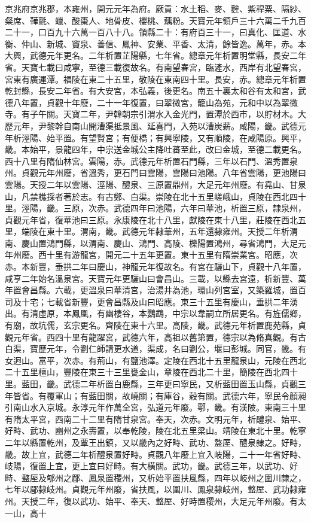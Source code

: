 \begin{pinyinscope}
 京兆府京兆郡，本雍州，開元元年為府。厥貢：水土稻、麥、麰、紫稈粟、隔紗、粲席、鞾氈、蠟、酸棗人、地骨皮、櫻桃、藕粉。天寶元年領戶三十六萬二千九百二十一，口百九十六萬一百八十八。領縣二十：有府百三十一，曰真化、匡道、水衡、仲山、新城、竇泉、善信、鳳神、安業、平香、太清，餘皆逸。萬年，赤。本大興，武德元年更名。二年析置芷陽縣，七年省。總章元年析置明堂縣，長安二年省。天寶七載曰咸寧，至德三載復故名。有南望春宮，臨滻水，西岸有北望春宮，宮東有廣運潭。福陵在東二十五里，敬陵在東南四十里。長安，赤。總章元年析置乾封縣，長安二年省。有大安宮，本弘義，後更名。南五十裏太和谷有太和宮，武德八年置，貞觀十年廢，二十一年復置，曰翠微宮，籠山為苑，元和中以為翠微寺。有子午關。天寶二年，尹韓朝宗引渭水入金光門，置潭於西市，以貯材木。大歷元年，尹黎幹自南山開漕渠抵景風、延喜門，入苑以漕炭薪。咸陽，畿。武德元年析涇陽、始平置。有望賢宮；有便橋；有興寧陵，又有順陵，在咸陽原。興平，畿。本始平，景龍四年，中宗送金城公主降吐蕃至此，改曰金城，至德二載更名。西十八里有隋仙林宮。雲陽，赤。武德元年析置石門縣，三年以石門、溫秀置泉州。貞觀元年州廢，省溫秀，更石門曰雲陽，雲陽曰池陽。八年省雲陽，更池陽曰雲陽。天授二年以雲陽、涇陽、醴泉、三原置鼎州，大足元年州廢。有堯山、甘泉山，凡禁樵採者著於志。有古鄭、白渠。崇陵在北十五里嵯峨山，貞陵在西北四十里。涇陽，畿。三原，次赤。武德四年曰池陽，六年曰華池，析置三原，隸泉州，貞觀元年省，復華池曰三原。永康陵在北十八里，獻陵在東十八里，莊陵在西北五里，端陵在東十里。渭南，畿。武德元年隸華州，五年還隸雍州。天授二年析渭南、慶山置鴻門縣，以渭南、慶山、鴻門、高陵、櫟陽置鴻州，尋省鴻門，大足元年州廢。西十里有游龍宮，開元二十五年更置。東十五里有隋崇業宮。昭應，次赤。本新豐，垂拱二年曰慶山，神龍元年復故名。有宮在驪山下，貞觀十八年置，咸亨二年始名溫泉宮。天寶元年更驪山曰會昌山。三載，以縣去宮遠，析新豐、萬年置會昌縣。六載，更溫泉曰華清宮，治湯井為池，環山列宮室，又築羅城，置百司及十宅；七載省新豐，更會昌縣及山曰昭應。東三十五里有慶山，垂拱二年湧出。有清虛原，本鳳凰，有幽棲谷，本鸚鵡，中宗以韋嗣立所居更名。有旌儒鄉，有廟，故坑儒，玄宗更名。齊陵在東十六里。高陵，畿。武德元年析置鹿苑縣，貞觀元年省。西四十里有龍躍宮，武德六年，高祖以舊第置，德宗以為脩真觀。有古白渠，寶歷元年，令劉仁師請更水道，渠成，名曰劉公，堰曰彭城。同官，畿。有女迥山。富平，次赤。有荊山，有鹽池澤。定陵在西北十五里龍泉山，元陵在西北二十五里檀山，豐陵在東三十三里甕金山，章陵在西北二十里，簡陵在西北四十里。藍田，畿。武德二年析置白鹿縣，三年更曰寧民，又析藍田置玉山縣，貞觀三年皆省。有覆軍山；有藍田關，故嶢關；有庫谷，穀有關。武德六年，寧民令顏昶引南山水入京城。永淳元年作萬全宮，弘道元年廢。鄠，畿。有渼陂。東南三十里有隋太平宮，西南二十二里有隋甘泉宮。奉天，次赤。文明元年，析醴泉、始平、好畤、武功、豳州之永壽置，以奉乾陵，陵在北五里梁山。靖陵在東北十里。乾寧二年以縣置乾州，及覃王出鎮，又以畿內之好畤、武功、盩厔、醴泉隸之。好畤，畿。故上宜，武德二年析醴泉置好畤。貞觀八年廢上宜入岐陽，二十一年省好畤、岐陽，復置上宜，更上宜曰好畤。有大橫關。武功，畿。武德三年，以武功、好畤、盩厔及郇州之郿、鳳泉置稷州，又析始平置扶風縣，四年以岐州之圍川隸之，七年以郿隸岐州。貞觀元年州廢，省扶風，以圍川、鳳泉隸岐州，盩厔、武功隸雍州。天授二年，復以武功、始平、奉天、盩厔、好畤置稷州，大足元年州廢。有太一山，高十
\end{pinyinscope}
